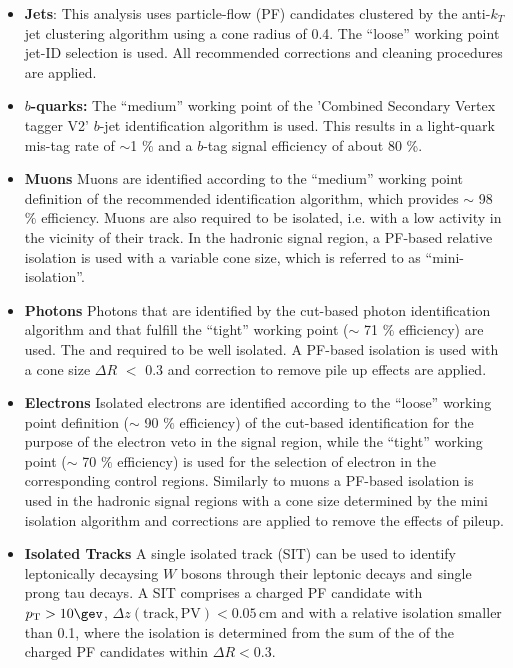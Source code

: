 \begin{itemize}
  \item{\bf Jets}: This analysis uses particle-flow (PF) candidates clustered by the anti-$k_{T}$ jet clustering algorithm \cite{Cacciari:2008gp} using a cone radius of 0.4. The ``loose'' working point jet-ID selection is used. All recommended corrections and cleaning procedures are applied.   %
    
  \item{\bf $b$-quarks:} The  ``medium'' working point of the 'Combined Secondary Vertex tagger V2' $b$-jet identification algorithm is used. This results in a light-quark mis-tag rate of $\sim$1 \%  and a $b$-tag signal efficiency of about 80 \%.   

  \item{\bf Muons} Muons are identified according to the ``medium'' working point definition of the recommended identification algorithm, which provides $\sim$ 98 $\%$ efficiency. 
Muons are also required to be isolated, i.e. with a low activity in the vicinity of their track. In the hadronic signal region, a PF-based relative isolation is used with a variable cone size, which is referred to as ``mini-isolation''. 

  \item{\bf Photons} Photons that are identified by the cut-based photon identification algorithm \cite{photon-id} and that fulfill the ``tight'' working point ($\sim$ 71 $\%$ efficiency) are used. The and required to be well isolated.  A PF-based isolation is used with a cone size $\Delta R$ $<$ 0.3  and correction to remove pile up effects are applied.


  \item{\bf Electrons} Isolated electrons are identified according to the ``loose'' working point definition ($\sim$ 90 $\%$ efficiency)  of the cut-based identification \cite{electron-id} for the purpose of the electron veto in the signal region, while the ``tight'' working point ($\sim$ 70 $\%$ efficiency) is used for the selection of electron in the corresponding control regions. Similarly to muons a PF-based isolation \cite{pf-photon} is used in the hadronic signal regions with a cone size determined by the mini isolation algorithm and corrections are applied to remove the effects of pileup.

  \item{\bf Isolated Tracks}  A single isolated track (SIT) can be used to identify leptonically decaysing $W$ bosons through their leptonic decays and single prong tau decays.
    A SIT comprises a charged PF candidate with $\Pt > 10 \gev$, $\Delta z(\mathrm{track}, \mathrm{PV}) < 0.05 \, \mathrm{cm}$  and with a relative isolation smaller than 0.1, where the isolation is determined from the sum of the \Pt of the charged PF candidates within $\Delta R < 0.3$.


\end{itemize}
